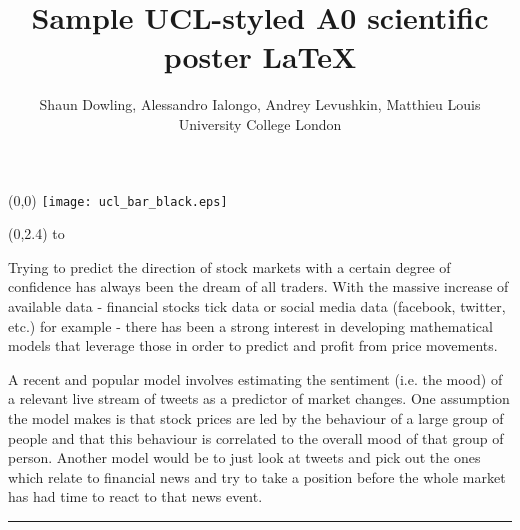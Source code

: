 \documentclass[a0]{a0poster}
\title{Sample UCL-styled A0 scientific poster \LaTeX}
\author{Shaun Dowling, Alessandro Ialongo, Andrey Levushkin, Matthieu Louis\\ University College London}
\def\Head#1{\noindent\hbox to \hsize{\hfil{\LARGE\color{DarkBlue}\sf #1}}\bigskip}
\begin{document}
\begin{textblock}{23}(0,0)
\vspace*{-48mm}\hspace*{-42mm}%
\texttt{[image: ucl\_bar\_black.eps]}
\begin{minipage}{1191mm}		%
\vspace{-20cm}
\maketitle
\end{minipage}
\end{textblock}


\begin{textblock}{7}(0,2.4)
\Head{Introductory segment}

\sf %
Trying to predict the direction of stock markets with a certain degree of confidence has always been the dream of all traders. With the massive increase of available data - financial stocks tick data or social media data (facebook, twitter, etc.) for example - there has been a strong interest in developing mathematical models that leverage those in order to predict and profit from price movements.

A recent and popular model involves estimating the sentiment (i.e. the mood) of a relevant live stream of tweets as a predictor of market changes. One assumption the model makes is that stock prices are led by the behaviour of a large group of people and that this behaviour is correlated to the overall mood of that group of person. Another model would be to just look at tweets and pick out the ones which relate to financial news and try to take a position before the whole market has had time to react to that news event.


\bigskip
\hrule
\end{textblock}
\end{document}

